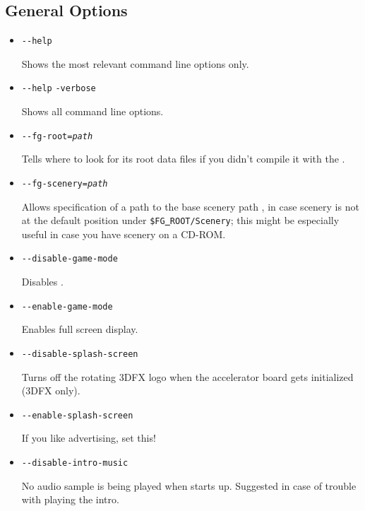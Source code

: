 \subsection{General Options}\label{generaloptions}
\begin{itemize}
\item{\texttt{-$ $-help}}

  Shows the most relevant command line options only.

\item{\texttt{-$ $-help} \texttt{-verbose}}

  Shows all command line options.

\item{\texttt{-$ $-fg-root={\it path}}}

  Tells \FlightGear{} where to look for its root data files if you
  didn't compile it with the .

\item{\texttt{-$ $-fg-scenery={\it path}}}

  Allows specification of a path to the base scenery path
  , in case scenery is not at the default
  position under \texttt{\$FG\underline{~}ROOT/Scenery}; this might
  be especially useful in case you have scenery on a CD-ROM.

\item{\texttt{-$ $-disable-game-mode}}

  Disables .

\item{\texttt{-$ $-enable-game-mode}}

  Enables full screen display.

\item{\texttt{-$ $-disable-splash-screen}}

  Turns off the rotating 3DFX logo when the accelerator board gets
  initialized (3DFX only).

\item{\texttt{-$ $-enable-splash-screen}}

  If you like advertising, set this!

\item{\texttt{-$ $-disable-intro-music}}

  No audio sample is being played when \FlightGear{} starts up.
  Suggested in case of trouble with playing the intro.


\end{itemize}
